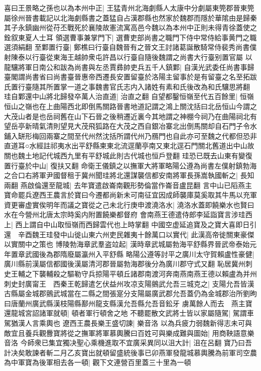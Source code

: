 喜曰王景略之孫也以為本州中正|{
	王猛青州北海劇縣人太康中分劇屬東筦郡晉東筦屬徐州晉書載記以北海劇縣書之蓋猛自占漢郡縣也然家於魏郡而隱於華隂由是歸秦其子永鎮幽州從苻丕戰死於襄陵故憲流寓高邑今魏以為本州中正則未得青徐蓋使之銓叙東夏人士耳}
領選曹事兼掌門下|{
	選曹吏部尚書之職門下侍中常侍給事黄門之職選須絹翻}
至鄴置行臺|{
	鄭樵曰行臺自魏晉有之晉文王討諸葛誕散騎常侍裴秀尚書僕射陳泰以行臺從東海王越帥衆屯許昌以行臺自隨後魏謂之尚書大行臺别置官屬}
以龍驤將軍日南公和跋為尚書與左丞賈彞帥吏兵五千人鎮鄴|{
	自漢光武委任尚書事歸臺閣謂尚書省曰尚書臺晉惠帝西遷長安置留臺於洛陽主留事於是有留臺之名至拓跋氏置行臺隨其所置掌一道之事魏書官氏志内入諸姓有素和氏後改為和氏驤思將翻}
珪自鄴還中山將北歸發卒萬人治直道|{
	治直之翻}
自望都鑿恒嶺至代五百餘里|{
	恒嶺恒山之嶺也在上曲陽西北即倒馬關路晉書地道記謂之鴻上關沈括曰北岳恒山今謂之大茂山者是也岳祠舊在山下石晉之後稍遷近裏今其地謂之神棚今祠乃在曲陽祠北有望岳亭新晴氣清則望見大茂飛狐路在大茂之西自銀冶寨北出倒馬關却自石門子令水鋪入缾形梅回兩寨之間至代州然沈括所謂代州乃鴈門也自此亦可至魏之代都但恐非直道耳○水經註祁夷水出平舒縣柬東北流逕蘭亭南又東北逕石門關北舊道出中山故關也魏土地記代城西九里有平舒城此則古代城也恒戶登翻}
珪恐已既去山東有變復置行臺於中山|{
	復扶又翻}
命衛王儀鎮之以撫軍大將軍略陽公遵為尚書左僕射鎮勃海之合口右將軍尹國督租于冀州聞珪將北還謀襲信都安南將軍長孫嵩執國斬之|{
	長知兩翻}
燕啟倫還至龍城|{
	去年寶遣啟崙南觀形勢倫當作崙音盧昆翻}
言中山已䧟燕主寶命罷兵遼西王農言於寶曰今遷都尚新未可南征宜因成師襲庫莫奚取其牛馬以充軍資更審虚實俟明年而議之寶從之己未北行庚申渡澆洛水|{
	澆洛水蓋即饒樂水也賢曰水在今營州北唐太宗時奚内附置饒樂都督府}
會南燕王德遣侍郎李延詣寶言涉珪西上|{
	西上謂自中山取恒嶺而西歸雲代也上時掌翻}
中國空虚延追寶及之寶大喜即日引還　辛酉魏王珪發中山徙山東六州吏民雜夷十餘萬口以實代|{
	此漢高帝徙關東豪傑以實關中之策也}
博陵勃海章武羣盗竝起|{
	漢時章武城屬勃海平舒縣界晉武帝泰始元年置章武國後為郡隋廢屬瀛州入平舒縣}
略陽公遵等討平之廣川太守賀賴盧性豪健|{
	廣川縣前漢屬信都國後漢屬清河郡晉屬勃海郡後分為廣川郡守式又翻}
恥居冀州刺史王輔之下襲輔殺之驅勒守兵掠陽平頓丘諸郡南渡河奔南燕南燕王德以賴盧為并州刺史封廣甯王　西秦王乾歸遣乞伏益州攻凉支陽鸇武允吾三城克之|{
	支陽允吾皆漢古縣屬金城郡鸇武城當在二縣之間張寔分支陽屬廣武郡允吾蓋仍為金城郡治所劉昫曰唐蘭州廣武縣漢枝陽縣鄯州龍支縣漢允吾縣允吾音鈆牙}
虜萬餘人而去　燕主寶還龍城宮詔諸軍就頓|{
	頓者軍行頓舍之地}
不聽罷散文武將士皆以家屬隨駕|{
	駕謂車駕猶漢人言乘輿也}
遼西王農長樂王盛切諫|{
	樂音洛}
以為兵疲力弱魏新得志未可與敵宜且養兵觀釁寶將從之撫軍將軍慕輿騰曰百姓可與樂成難與圖始|{
	用商鞅語意樂音洛}
今師衆已集宜獨决聖心乘機進取不宜廣采異同以沮大計|{
	沮在呂翻}
寶乃曰吾計决矣敢諫者斬二月乙亥寶出就頓留盛統後事已卯燕軍發龍城慕輿騰為前軍司空農為中軍寶為後軍相去各一頓|{
	觀下文連營百里蓋三十里為一頓}
